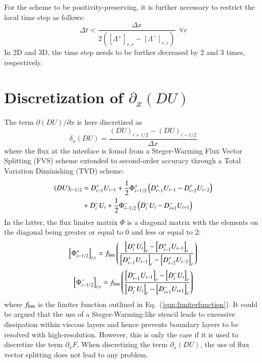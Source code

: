 \documentclass{warpdoc}
\newcommand{\alb}{\vspace{0.2cm}\\} %
\newcommand{\mfd}{\displaystyle}
\begin{document}
For the scheme to be positivity-preserving, it is further necessary to restrict the local time step as follows:
%
\begin{equation}
\Delta t
<
\frac{\Delta x}{   
2 \left(\left[\Lambda^+ \right]_{r,r}-\left[\Lambda^- \right]_{r,r}\right)
}~~\forall r
\end{equation}
%
In 2D and 3D, the time step needs to be further decreased by 2 and 3 times, respectively.







\section{Discretization of $\partial_x (DU)$}


The term $\partial (DU)/\partial x$ is here discretized as
%
\begin{equation}
\delta_x (DU) = \frac{(DU)_{i+1/2}-(DU)_{i-1/2}}{\Delta x}
\end{equation}
%
where the flux at the interface is found from a Steger-Warming Flux Vector Splitting (FVS) scheme \cite{jcp:1981:steger} extended to second-order accuracy through a Total Variation Diminishing (TVD) scheme:
%
\begin{align}
(DU)_{i-1/2}&=
  D_{i-1}^+ U_{i-1} 
+\frac{1}{2} \Phi^+_{i-1/2} \left(  D_{i-1}^+ U_{i-1}  -  D_{i-2}^+ U_{i-2}\right)  \nonumber\alb
&+ D_{i}^- U_i
+\frac{1}{2} \Phi^-_{i-1/2} \left(  D_{i}^- U_i -  D_{i+1}^- U_{i+1}\right) 
\end{align}
%
In the latter, the flux limiter matrix $\Phi$ is a diagonal matrix with the elements on the diagonal being greater or equal to 0 and less or equal to 2: 
%
\begin{equation}
\left[\Phi_{i-1/2}^+\right]_{r,r} =  {f_{\rm lim}}\left(\mfd\frac{\left[D_{i}^+ U_i\right]_r -\left[D_{i-1}^+ U_{i-1}\right]_r}{\left[D_{i-1}^+ U_{i-1}\right]_r-\left[D_{i-2}^+ U_{i-2}\right]_r}  \right)
\end{equation}
%
%
\begin{equation}
\left[\Phi_{i-1/2}^-\right]_{r,r} =  {f_{\rm lim}}\left(\mfd\frac{\left[D_{i-1}^- U_{i-1}\right]_r -\left[D_{i}^- U_i\right]_r}{\left[D_{i}^- U_i\right]_r-\left[D_{i+1}^- U_{i+1}\right]_r}  \right) 
\end{equation}
%
where $f_{\rm lim}$ is the limiter function outlined in Eq.\ (\ref{eqn:limiterfunction}). 
It could be argued that the use of a Steger-Warming-like stencil leads to excessive dissipation within viscous layers and hence prevents boundary layers to be resolved with high-resolution. However, this is only the case if it is used to discretize the term $\partial_x F$. When discretizing the term $\partial_x (DU)$, the use of flux vector splitting does not lead to any problem. 
\end{document}
